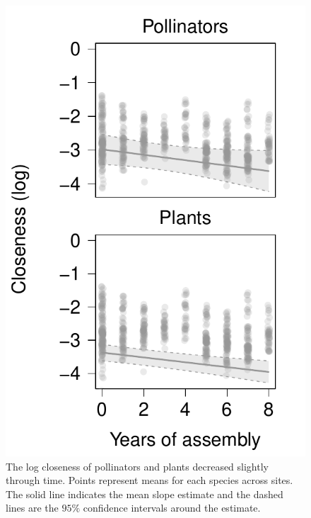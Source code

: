 \documentclass[12pt]{article}
\begin{document}
\begin{figure}
  \centering
  \includegraphics[width=.6\textwidth]{../analysis/speciesLevel/figures/closenessPanel.pdf}
  \caption{The log closeness of pollinators and plants decreased
    slightly through time. Points represent means for each species
    across sites. The solid line indicates the mean slope estimate and
    the dashed lines are the $95\%$ confidence intervals around the
    estimate.}
  \label{fig:closeness}
\end{figure}
\clearpage
\end{document}
